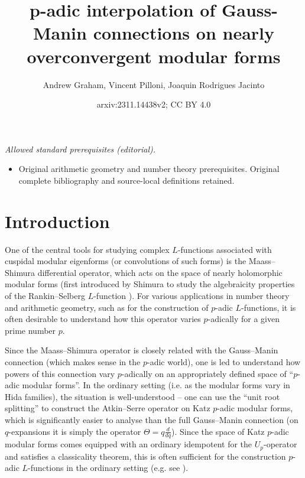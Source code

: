 \documentclass[10pt, oneside]{amsart}
\title{p-adic interpolation of Gauss-Manin connections on nearly overconvergent modular forms}
\author{Andrew Graham, Vincent Pilloni, Joaquin Rodrigues Jacinto}
\date{arxiv:2311.14438v2; CC BY 4.0}
\numberwithin{equation}{subsection}
\theoremstyle{definition}
\theoremstyle{remark}
\begin{document}
\maketitle
\noindent\textit{Allowed standard prerequisites (editorial).}\begin{itemize}
\item Original arithmetic geometry and number theory prerequisites. Original complete bibliography and source-local definitions retained.
\end{itemize}\medskip
\section{Introduction}

One of the central tools for studying complex $L$-functions associated with cuspidal modular eigenforms (or convolutions of such forms) is the Maass--Shimura differential operator, which acts on the space of nearly holomorphic modular forms (first introduced by Shimura to study the algebraicity properties of the Rankin--Selberg $L$-function \cite{Shimura76, Shimura86}). For various applications in number theory and arithmetic geometry, such as for the construction of $p$-adic $L$-functions, it is often desirable to understand how this operator varies $p$-adically for a given prime number $p$.

Since the Maass--Shimura operator is closely related with the Gauss--Manin connection (which makes sense in the $p$-adic world), one is led to understand how powers of this connection vary $p$-adically on an appropriately defined space of ``$p$-adic modular forms''. In the ordinary setting (i.e. as the modular forms vary in Hida families), the situation is well-understood -- one can use the ``unit root splitting'' to construct the Atkin--Serre operator on Katz $p$-adic modular forms, which is significantly easier to analyse than the full Gauss--Manin connection (on $q$-expansions it is simply the operator $\Theta = q \frac{d}{dq}$). Since the space of Katz $p$-adic modular forms comes equipped with an ordinary idempotent for the $U_p$-operator and satisfies a classicality theorem, this is often sufficient for the construction $p$-adic $L$-functions in the ordinary setting (e.g. see \cite{DarmonRotgerGrossZagier1}).
\end{document}

